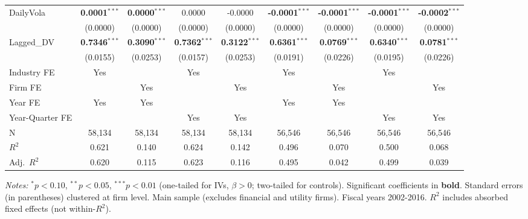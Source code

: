 \begin{landscape}
\begin{table}[H]
\begin{tabular}{lcccccccc}
DailyVola & \textbf{0.0001}$^{***}$ & \textbf{0.0000}$^{***}$ & 0.0000 & -0.0000 & \textbf{-0.0001}$^{***}$ & \textbf{-0.0001}$^{***}$ & \textbf{-0.0001}$^{***}$ & \textbf{-0.0002}$^{***}$ \\
 & (0.0000) & (0.0000) & (0.0000) & (0.0000) & (0.0000) & (0.0000) & (0.0000) & (0.0000) \\
Lagged\_DV & \textbf{0.7346}$^{***}$ & \textbf{0.3090}$^{***}$ & \textbf{0.7362}$^{***}$ & \textbf{0.3122}$^{***}$ & \textbf{0.6361}$^{***}$ & \textbf{0.0769}$^{***}$ & \textbf{0.6340}$^{***}$ & \textbf{0.0781}$^{***}$ \\
 & (0.0155) & (0.0253) & (0.0157) & (0.0253) & (0.0191) & (0.0226) & (0.0195) & (0.0226) \\
\midrule
Industry FE & Yes &  & Yes &  & Yes &  & Yes &  \\
Firm FE &  & Yes &  & Yes &  & Yes &  & Yes \\
Year FE & Yes & Yes &  &  & Yes & Yes &  &  \\
Year-Quarter FE &  &  & Yes & Yes &  &  & Yes & Yes \\
\midrule
N & 58,134 & 58,134 & 58,134 & 58,134 & 56,546 & 56,546 & 56,546 & 56,546 \\
$R^2$ & 0.621 & 0.140 & 0.624 & 0.142 & 0.496 & 0.070 & 0.500 & 0.068 \\
Adj.~$R^2$ & 0.620 & 0.115 & 0.623 & 0.116 & 0.495 & 0.042 & 0.499 & 0.039 \\
\bottomrule
\end{tabular}
\begin{minipage}{\linewidth}
\vspace{2pt}\scriptsize
\textit{Notes:} $^{*}p<0.10$, $^{**}p<0.05$, $^{***}p<0.01$ (one-tailed for IVs, $\beta > 0$; two-tailed for controls).
 Significant coefficients in \textbf{bold}.
 Standard errors (in parentheses) clustered at firm level.
 Main sample (excludes financial and utility firms). Fiscal years 2002-2016.
 $R^2$ includes absorbed fixed effects (not within-$R^2$).
\end{minipage}
\end{table}
\end{landscape}